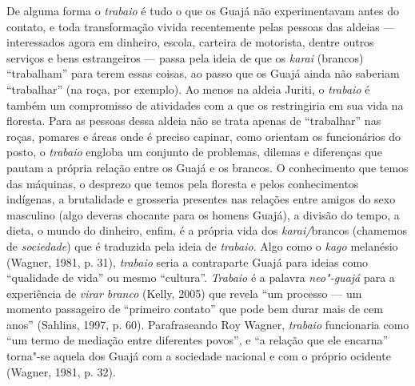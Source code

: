 De alguma forma o \emph{trabaio} é tudo o que os Guajá não
experimentavam antes do contato, e toda transformação vivida
recentemente pelas pessoas das aldeias --- interessados agora em dinheiro,
escola, carteira de motorista, dentre outros serviços e bens
estrangeiros --- passa pela ideia de que os \emph{karai} (brancos)
``trabalham'' para terem essas coisas, ao passo que os Guajá ainda não
saberiam ``trabalhar'' (na roça, por exemplo). Ao menos na aldeia
Juriti, o \emph{trabaio} é também um compromisso de atividades com a
 que os restringiria em sua vida na floresta. Para as pessoas dessa
aldeia não se trata apenas de ``trabalhar'' nas roças, pomares e áreas
onde é preciso capinar, como orientam os funcionários do posto, o
\emph{trabaio} engloba um conjunto de problemas, dilemas e diferenças
que pautam a própria relação entre os Guajá e os brancos. O conhecimento
que temos das máquinas, o desprezo que temos pela floresta e pelos
conhecimentos indígenas, a brutalidade e grosseria presentes nas
relações entre amigos do sexo masculino (algo deveras chocante para os
homens Guajá), a divisão do tempo, a dieta, o mundo do dinheiro, enfim,
é a própria vida dos \emph{karai/}brancos (chamemos de \emph{sociedade})
que é traduzida pela ideia de \emph{trabaio}. Algo como o \emph{kago}
melanésio (Wagner, 1981, p. 31), \emph{trabaio} seria a contraparte Guajá
para ideias como ``qualidade de vida'' ou mesmo ``cultura''.
\emph{Trabaio} é a palavra \emph{neo"-guajá} para a experiência de
\emph{virar branco} (Kelly, 2005) que revela ``um processo --- um momento
passageiro de ``primeiro contato'' que pode bem durar mais de cem anos''
(Sahlins, 1997, p. 60). Parafraseando Roy Wagner, \emph{trabaio}
funcionaria como ``um termo de mediação entre diferentes povos'', e ``a
relação que ele encarna'' torna"-se aquela dos Guajá com a sociedade
nacional e com o próprio ocidente (Wagner, 1981, p. 32).
